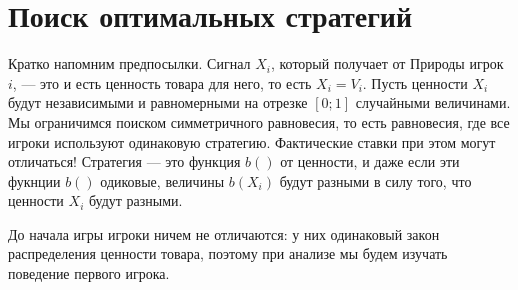 \section{Поиск оптимальных стратегий}

Кратко напомним предпосылки. Сигнал $ X_{i} $, который получает от Природы игрок $i$, — это и есть ценность товара для него, то есть $ X_{i}=V_{i} $. Пусть ценности $ X_{i} $ будут независимыми и равномерными на отрезке $ [0;1] $ случайными величинами. Мы ограничимся поиском симметричного равновесия, то есть равновесия, где все игроки используют одинаковую стратегию. Фактические ставки при этом могут отличаться! Стратегия — это функция $b()$ от ценности, и даже если эти фукнции $ b() $ одиковые, величины $ b(X_{i}) $ будут разными в силу того, что ценности $ X_{i} $ будут разными.


До начала игры игроки ничем не отличаются: у них одинаковый закон распределения ценности товара, поэтому при анализе мы будем изучать поведение первого игрока.

